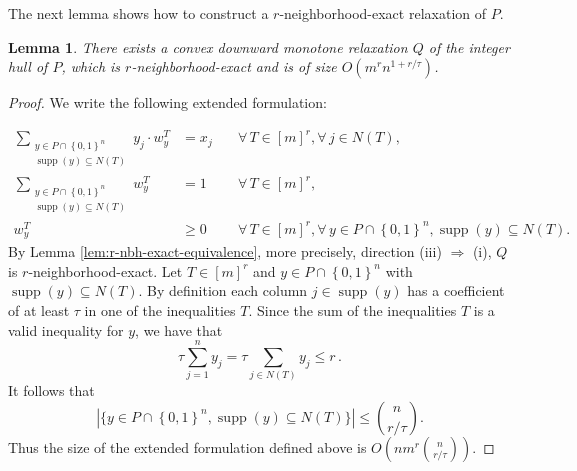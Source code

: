 \documentclass[11pt]{article}
\DeclareMathOperator{\supp}{supp}
\DeclareMathOperator{\conv}{conv}
\newcommand{\numrows}{r}
\newtheorem{lemma}[theorem]{Lemma}
\newcommand{\rb}[1]{\left(#1\right)}
\newcommand{\set}[1]{\left\{#1\right\}}
\theoremstyle{remark}
\begin{document}
The next lemma shows how to construct a $\numrows$-neighborhood-exact relaxation of $P$.

\begin{lemma}\label{lem:construction-r-neighborhood-exact-relaxation}
    There exists a convex downward monotone relaxation $Q$ of the integer hull of $P$, which is $\numrows$-neighborhood-exact and is of size $O(m^rn^{1 + r/\tau})$.
\end{lemma}
\begin{proof}
    We write the following extended formulation:
    
    \begin{align*}
	    \sum_{\substack{y \in P\cap \set{0,1}^n \\ \supp(y) \subseteq N(T)}} y_j \cdot w^T_y &= x_j &\quad \forall\, T \in [m]^r, \forall\, j \in N(T), \\
	    \sum_{\substack{y \in P\cap \set{0,1}^n \\ \supp(y) \subseteq N(T)}} w^T_y &= 1 &\quad \forall\, T \in [m]^r,\\
	    w^T_y &\geq 0 &\quad \forall\, T \in [m]^\numrows, \forall\, y \in P\cap \set{0,1}^n, \supp(y) \subseteq N(T).
    \end{align*}
    By Lemma \ref{lem:r-nbh-exact-equivalence}, more precisely, direction (iii) $\Rightarrow$ (i), $Q$ is $\numrows$-neighborhood-exact. 
	Let $T\in [m]^\numrows$ and $y\in P\cap \set{0,1}^n$ with $\supp(y) \subseteq N(T)$.
	By definition each column $j\in \supp(y)$ has a coefficient of at least $\tau$ in one of the
	inequalities $T$. Since the sum of the inequalities $T$ is a valid inequality for $y$, we have
	that
	\begin{equation*}
		\tau \sum_{j = 1}^n y_j = \tau \sum_{j\in N(T)} y_j \le r \, .
	\end{equation*}
	It follows that
	\begin{equation*}
		|\{y \in P\cap \set{0,1}^n, \supp(y) \subseteq N(T)\}| \le \binom{n}{r / \tau} .
	\end{equation*}
	Thus the size of the extended formulation defined above is $O(n m^r \binom{n}{r/\tau})$.
\end{proof}
\end{document}
